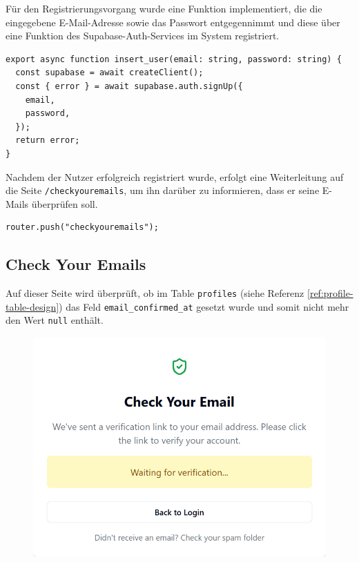 \begin{inhalt}
Für den Registrierungsvorgang wurde eine Funktion implementiert, die die eingegebene E-Mail-Adresse sowie das Passwort entgegennimmt und diese über eine Funktion des Supabase-Auth-Services im System registriert.


\begin{lstlisting}[style=mytsx]
export async function insert_user(email: string, password: string) {
  const supabase = await createClient();
  const { error } = await supabase.auth.signUp({
    email,
    password,
  });
  return error;
}
\end{lstlisting}

Nachdem der Nutzer erfolgreich registriert wurde, erfolgt eine Weiterleitung auf die Seite \texttt{/checkyouremails}, um ihn darüber zu informieren, dass er seine E-Mails überprüfen soll.

\begin{lstlisting}[style=mytsx]
      router.push("checkyouremails");
\end{lstlisting}

\subsection{Check Your Emails}

Auf dieser Seite wird überprüft, ob im Table \texttt{profiles} (siehe Referenz \ref{ref:profile-table-design}) das Feld \texttt{email\_confirmed\_at} gesetzt wurde und somit nicht mehr den Wert \texttt{null} enthält.  


\begin{figure}[!htb]
\centering
\includegraphics[width=1\textwidth]{files/Thomas/pics/Website/emailconfirmed/checkyouremails_waiting_verification.png}
\caption[Bildbezeichnung für Abbildungsverzeichnis]{}
\label{fig:gehaeuse_internet_bild}
\end{figure}


\end{inhalt}
